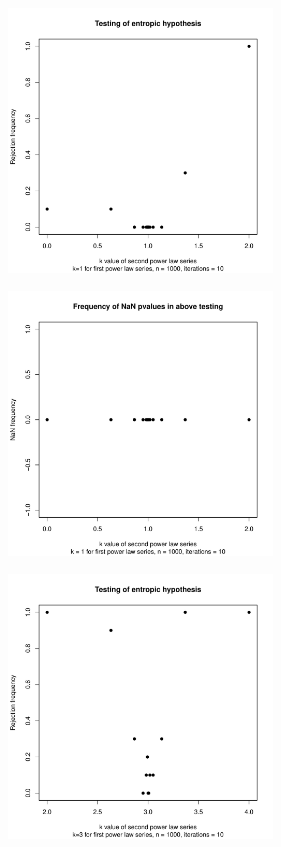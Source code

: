 \begin{figure}
    \centering
    \begin{subfigure}[b]{0.3\textwidth}
        \centering
        \includegraphics[height=7cm,keepaspectratio]{powerlaw/rejectionPlot,k1=1, n=1000, iterations=10.pdf}
    \end{subfigure}
    \hfill
    \begin{subfigure}[b]{0.5\textwidth}
        \centering
        \includegraphics[height=7cm,keepaspectratio]{powerlaw/NaNPlot,k1=1, n=1000, iterations=10.pdf}
    \end{subfigure}
    \vfill
    \begin{subfigure}[b]{0.3\textwidth}
        \centering
        \includegraphics[height=7cm,keepaspectratio]{powerlaw/rejectionPlot,k1=3, n=1000, iterations=10.pdf}

\end{subfigure}
\end{figure}
